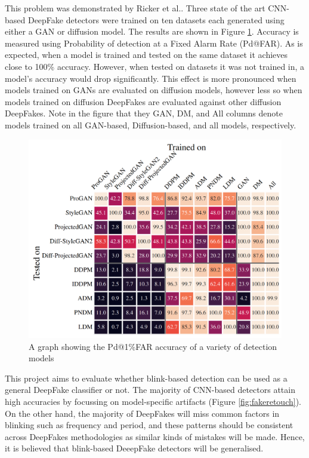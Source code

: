 This problem was demonstrated by Ricker et al.\cite{ricker2022towards}. Three state of the art CNN-based DeepFake detectors were trained on ten datasets each generated using either a GAN or diffusion model. The results are shown in Figure \ref{fig:transferability}. Accuracy is measured using Probability of detection at a Fixed Alarm Rate (Pd@FAR). As is expected, when a model is trained and tested on the same dataset it achieves close to 100\% accuracy. However, when tested on datasets it was not trained in, a model's accuracy would drop significantly. This effect is more pronounced when models trained on GANs are evaluated on diffusion models, however less so when models trained on diffusion DeepFakes are evaluated against other diffusion DeepFakes. Note in the figure that they GAN, DM, and All columns denote models trained on all GAN-based, Diffusion-based, and all models, respectively.

\begin{figure}[h]
    \centering
    \includegraphics[width=0.75\linewidth]{dissertation//figures/transferability.png}
    \caption{A graph showing the Pd@1\%FAR accuracy of a variety of detection models\cite{ricker2022towards}}
    \label{fig:transferability}
\end{figure}

This project aims to evaluate whether blink-based detection can be used as a general DeepFake classifier or not. The majority of CNN-based detectors attain high accuracies by focussing on model-specific artifacts (Figure \ref{fig:fakeretouch}). On the other hand, the majority of DeepFakes will miss common factors in blinking such as frequency and period, and these patterns should be consistent across DeepFakes methodologies as similar kinds of mistakes will be made. Hence, it is believed that blink-based DeeepFake detectors will be generalised.

